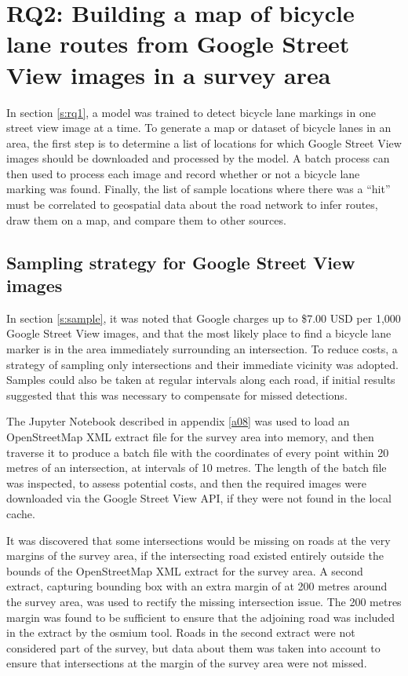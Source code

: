 \documentclass[11pt,twoside]{report}
\begin{document}
\section{RQ2: Building a map of bicycle lane routes from Google Street View images in a survey area}
\label{s:rq2}

In section \ref{s:rq1}, a model was trained to detect bicycle lane markings in one street view image at a time.  To generate a map or dataset of bicycle lanes in an area, the first step is to determine a list of locations for which Google Street View images should be downloaded and processed by the model.  A batch process can then used to process each image and record whether or not a bicycle lane marking was found.  Finally, the list of sample locations where there was a ``hit'' must be correlated to geospatial data about the road network to infer routes, draw them on a map, and compare them to other sources.


\subsection{Sampling strategy for Google Street View images}
\label{s:rq2a}

In section \ref{s:sample}, it was noted that Google charges up to \$7.00 USD per 1,000 Google Street View images, and that the most likely place to find a bicycle lane marker is in the area immediately surrounding an intersection.  To reduce costs, a strategy of sampling only intersections and their immediate vicinity was adopted.  Samples could also be taken at regular intervals along each road, if initial results suggested that this was necessary to compensate for missed detections.

The Jupyter Notebook described in appendix \ref{a08} was used to load an OpenStreetMap XML extract file for the survey area into memory, and then traverse it to produce a batch file with the coordinates of every point within 20 metres of an intersection, at intervals of 10 metres.  The length of the batch file was inspected, to assess potential costs, and then the required images were downloaded via the Google Street View API, if they were not found in the local cache.

It was discovered that some intersections would be missing on roads at the very margins of the survey area, if the intersecting road existed entirely outside the bounds of the OpenStreetMap XML extract for the survey area.  A second extract, capturing bounding box with an extra margin of at 200 metres around the survey area, was used to rectify the missing intersection issue.  The 200 metres margin was found to be sufficient to ensure that the adjoining road was included in the extract by the osmium tool.  Roads in the second extract were not considered part of the survey, but data about them was taken into account to ensure that intersections at the margin of the survey area were not missed.
\end{document}
